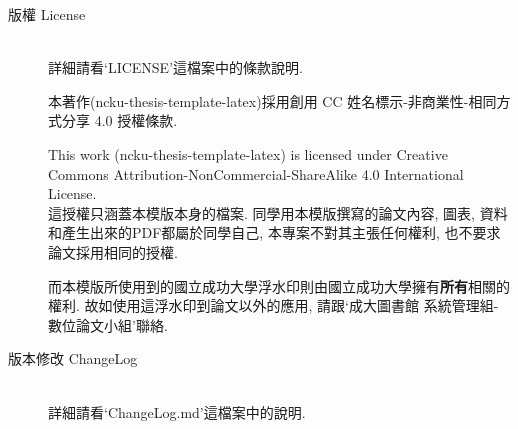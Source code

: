 \begin{description}
  \item[版權 License]\hfill\\
  詳細請看`LICENSE'這檔案中的條款說明.\\


    本著作(ncku-thesis-template-latex)採用創用 CC 姓名標示-非商業性-相同方式分享 4.0 授權條款.

    This work (ncku-thesis-template-latex) is licensed under Creative Commons Attribution-NonCommercial-ShareAlike 4.0 International License.\\

    這授權只涵蓋本模版本身的檔案. 同學用本模版撰寫的論文內容, 圖表, 資料和產生出來的PDF都屬於同學自己, 本專案不對其主張任何權利, 也不要求論文採用相同的授權.

  而本模版所使用到的國立成功大學浮水印則由國立成功大學擁有\textbf{所有}相關的權利. 故如使用這浮水印到論文以外的應用, 請跟`成大圖書館 系統管理組-數位論文小組'聯絡.\\

  \item[版本修改 ChangeLog]\hfill\\
  詳細請看`ChangeLog.md'這檔案中的說明.
\end{description}

\EndChapter
